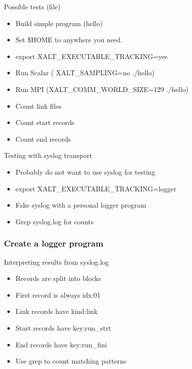 \documentclass{beamer}
\begin{document}
\begin{frame}{Possible tests (file)}
  \begin{itemize}
    \item Build simple program (hello)
    \item Set \$HOME to anywhere you need.
    \item export XALT\_EXECUTABLE\_TRACKING=yes
    \item Run Scalar ( XALT\_SAMPLING=no ./hello)
    \item Run MPI (XALT\_COMM\_WORLD\_SIZE=129 ./hello)
    \item Count link files
    \item Count start records
    \item Count end records
  \end{itemize}
\end{frame}

\begin{frame}{Testing with syslog transport}
  \begin{itemize}
    \item Probably do not want to use syslog for testing
    \item export XALT\_EXECUTABLE\_TRACKING=logger
    \item Fake syslog with a personal logger program
    \item Grep syslog.log for counts
  \end{itemize}
\end{frame}

\begin{frame}[fragile]
    \frametitle{Create a logger program}
 {\small
}
\end{frame}

\begin{frame}{Interpreting results from syslog.log}
  \begin{itemize}
    \item Records are split into blocks
    \item First record is always idx:01
    \item Link records have kind:link
    \item Start records have key:run\_strt
    \item End records have key:run\_fini
    \item Use grep to count matching patterns
  \end{itemize}
\end{frame}
\end{document}
